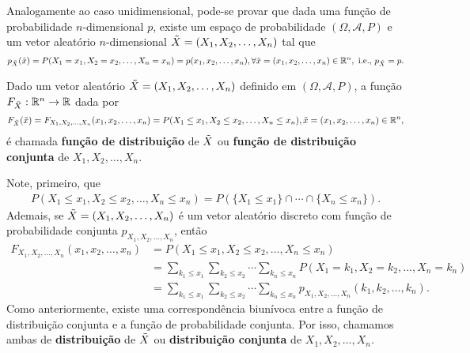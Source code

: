 \documentclass[../Notas.tex]{subfiles}
\begin{document}
Analogamente ao caso unidimensional, pode-se provar que dada uma função de probabilidade $n$-dimensional $p$, existe um espaço de probabilidade $(\Omega, \mathcal{A}, P)$ e um vetor aleatório $n$-dimensional $\Tilde{X} = (X_1, X_2, \dots, X_n)$ tal que
\begin{align*}
    p_{\Tilde{X}}(\Tilde{x}) = P(X_1=x_1, X_2=x_2, \dots, X_n=x_n) = p(x_1, x_2, \dots, x_n), \forall \Tilde{x} = (x_1, x_2, \dots, x_n)\in\mathbb{R}^n, \text{ i.e., } p_{\Tilde{X}} = p.
\end{align*}

\begin{definition}
Dado um vetor aleatório $\Tilde{X} = (X_1, X_2, \dots, X_n)$ definido em $(\Omega, \mathcal{A}, P)$, a função $F_{\Tilde{X}}:\mathbb{R}^n\to\mathbb{R}$ dada por
\begin{align*}
    F_{\Tilde{X}}(\Tilde{x}) = F_{X_1, X_2, \dots, X_n}(x_1, x_2, \dots, x_n) = P(X_1\leq x_1, X_2\leq x_2, \dots, X_n\leq x_n), \Tilde{x} = (x_1, x_2, \dots, x_n)\in\mathbb{R}^n,
\end{align*}
é chamada \textbf{função de distribuição} de $\Tilde{X}$ ou \textbf{função de distribuição conjunta} de $X_1, X_2, \dots, X_n$.
\end{definition}

\begin{remark}
Note, primeiro, que
\begin{align*}
    P(X_1\leq x_1, X_2\leq x_2, \dots, X_n\leq x_n) = P(\{ X_1\leq x_1 \}\cap\cdots\cap\{ X_n\leq x_n \}).
\end{align*}
Ademais, se $\Tilde{X} = (X_1, X_2, \dots, X_n)$ é um vetor aleatório discreto com função de probabilidade conjunta $p_{X_1, X_2, \dots, X_n}$, então
\begin{align*}
    F_{X_1, X_2, \dots, X_n}(x_1, x_2, \dots, x_n) &= P(X_1\leq x_1, X_2\leq x_2, \dots, X_n\leq x_n) \\
    &= \sum_{k_1\leq x_1}\sum_{k_2\leq x_2}\cdots\sum_{k_n\leq x_n}P(X_1=k_1, X_2=k_2, \dots, X_n=k_n) \\
    &= \sum_{k_1\leq x_1}\sum_{k_2\leq x_2}\cdots\sum_{k_n\leq x_n} p_{X_1, X_2, \dots, X_n}(k_1, k_2, \dots, k_n).
\end{align*}
Como anteriormente, existe uma correspondência biunívoca entre a função de distribuição conjunta e a função de probabilidade conjunta. Por isso, chamamos ambas de \textbf{distribuição} de $\Tilde{X}$ ou \textbf{distribuição conjunta} de $X_1, X_2, \dots, X_n$.
\end{remark}
\end{document}
